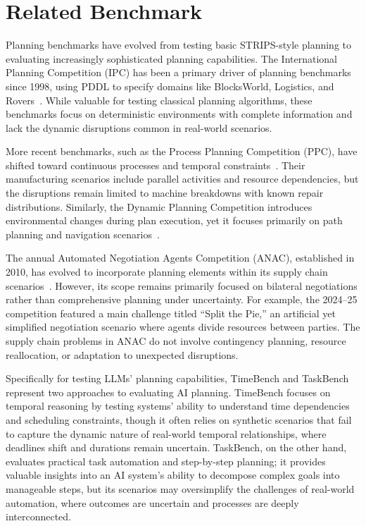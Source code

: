 \section{Related Benchmark}

Planning benchmarks have evolved from testing basic STRIPS-style planning to evaluating increasingly sophisticated planning capabilities. The International Planning Competition (IPC) has been a primary driver of planning benchmarks since 1998, using PDDL to specify domains like BlocksWorld, Logistics, and Rovers~\cite{PlanningCompetition2024}. While valuable for testing classical planning algorithms, these benchmarks focus on deterministic environments with complete information and lack the dynamic disruptions common in real-world scenarios.

More recent benchmarks, such as the Process Planning Competition (PPC), have shifted toward continuous processes and temporal constraints~\cite{ppc2020}. Their manufacturing scenarios include parallel activities and resource dependencies, but the disruptions remain limited to machine breakdowns with known repair distributions. Similarly, the Dynamic Planning Competition introduces environmental changes during plan execution, yet it focuses primarily on path planning and navigation scenarios~\cite{dpc2022}.

The annual Automated Negotiation Agents Competition (ANAC), established in 2010, has evolved to incorporate planning elements within its supply chain scenarios~\cite{anac2023}. However, its scope remains primarily focused on bilateral negotiations rather than comprehensive planning under uncertainty. For example, the 2024–25 competition featured a main challenge titled ``Split the Pie,'' an artificial yet simplified negotiation scenario where agents divide resources between parties. The supply chain problems in ANAC do not involve contingency planning, resource reallocation, or adaptation to unexpected disruptions.

Specifically for testing LLMs' planning capabilities, TimeBench \cite{chu2023timebench} and TaskBench \cite{shen2023taskbench} represent two approaches to evaluating AI planning. TimeBench focuses on temporal reasoning by testing systems' ability to understand time dependencies and scheduling constraints, though it often relies on synthetic scenarios that fail to capture the dynamic nature of real-world temporal relationships, where deadlines shift and durations remain uncertain. TaskBench, on the other hand, evaluates practical task automation and step-by-step planning; it provides valuable insights into an AI system's ability to decompose complex goals into manageable steps, but its scenarios may oversimplify the challenges of real-world automation, where outcomes are uncertain and processes are deeply interconnected.

